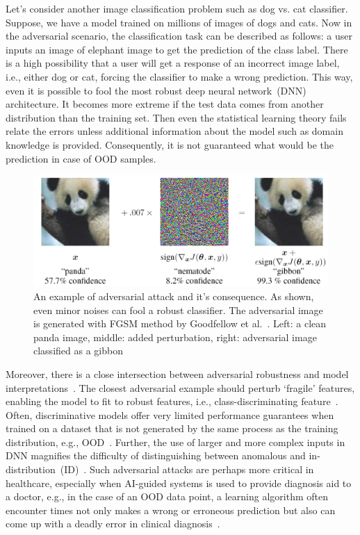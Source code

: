 \hspace*{3.5mm} Let's consider another image classification problem such as dog vs. cat classifier. Suppose, we have a  model trained on millions of images of dogs and cats. Now in the adversarial scenario, the classification task can be described as follows: a user inputs an image of elephant image to get the prediction of the class label. There is a high possibility that a user will get a response of an incorrect image label, i.e., either dog or cat, forcing the classifier to make a wrong prediction. This way, even it is possible to fool the most robust deep neural network~(DNN) architecture. It becomes more extreme if the test data comes from another distribution than the training set. Then even the statistical learning theory fails relate the errors unless additional information about the model such as domain knowledge is provided. Consequently, it is not guaranteed what would be the prediction in case of OOD samples. 

\begin{figure}
    \centering
    \includegraphics[scale=0.8]{images/panda_adversary.png}
    \caption[An example of adversarial attack and it's consequence]{An example of adversarial attack and it's consequence. As shown, even minor noises can fool a robust classifier. The adversarial image is generated with FGSM method by Goodfellow et al.~\cite{goodfellow2014explaining}. Left: a clean panda image, middle: added perturbation, right: adversarial image classified as a gibbon}
    \label{fig:fgsm_example}
    \vspace{-4mm}
\end{figure}

\hspace*{3.5mm} Moreover, there is a close intersection between adversarial robustness and model interpretations~\cite{bhatt2020explainable,sharma2019certifai}. The closest adversarial example should perturb `fragile' features, enabling the model to fit to robust features, i.e., class-discriminating feature~\cite{bhatt2020explainable}. Often, discriminative models offer very limited performance guarantees when trained on a dataset that is not generated by the same process as the training distribution, e.g., OOD~\cite{OOD1}. Further, the use of larger and more complex inputs in DNN magnifies the difficulty of distinguishing between anomalous and in-distribution~(ID)~\cite{OOD5}. Such adversarial attacks are perhaps more critical in healthcare, especially when AI-guided systems is used to provide diagnosis aid to a doctor, e.g., in the case of an OOD data point, a learning algorithm often encounter times not only makes a wrong or erroneous prediction but also can come up with a deadly error in clinical diagnosis~\cite{OOD1}. 

